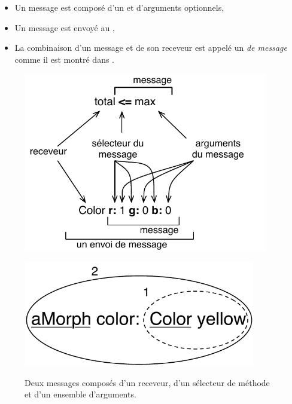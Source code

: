 \documentclass[a4paper,10pt,twoside]{book}
\begin{document}
\begin{itemize}
  \item Un message est composé d'un  et d'arguments optionnels,
  \item Un message est envoyé au ,
  \item La combinaison d'un message et de son receveur est appelé un  \emph{de message}  comme il est montré dans .
\end{itemize}

\begin{figure}[htb]
\begin{minipage}{0.53\textwidth}
	\begin{center}
	\includegraphics[width=0.95\textwidth]{message}
	\caption{Deux messages composés d'un receveur, d'un sélecteur de méthode et d'un ensemble d'arguments.}\end{center}
\end{minipage}
\hfill
\begin{minipage}{0.43\textwidth}
	\begin{center}
	\ifluluelse
		{\includegraphics[width=0.9\textwidth]{uKeyUnOne}}

\end{center}
\end{minipage}
\end{figure}
\end{document}
